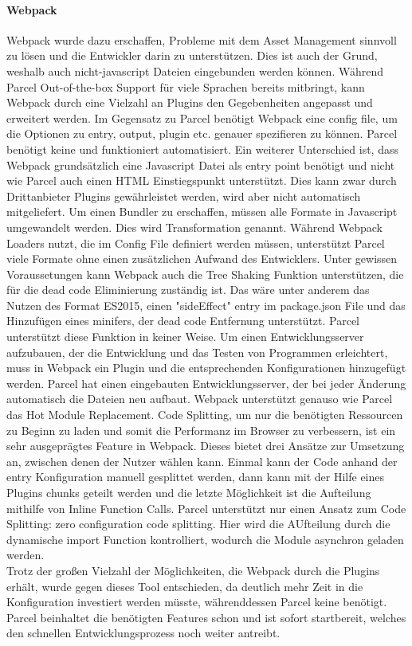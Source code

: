 \paragraph{Webpack} Webpack wurde dazu erschaffen, Probleme mit dem Asset Management sinnvoll zu lösen und die Entwickler darin zu unterstützen. Dies ist auch der Grund, weshalb auch nicht-javascript Dateien eingebunden werden können. Während Parcel Out-of-the-box Support für viele Sprachen bereits mitbringt, kann Webpack durch eine Vielzahl an Plugins den Gegebenheiten angepasst und erweitert werden. Im Gegensatz zu Parcel benötigt Webpack eine config file, um die Optionen zu entry, output, plugin etc. genauer spezifieren zu können. Parcel benötigt keine und funktioniert automatisiert. Ein weiterer Unterschied ist, dass Webpack grundsätzlich eine Javascript Datei als entry point benötigt und nicht wie Parcel auch einen HTML Einstiegspunkt unterstützt. Dies kann zwar durch Drittanbieter Plugins gewährleistet werden, wird aber nicht automatisch mitgeliefert. Um einen Bundler zu erschaffen, müssen alle Formate in Javascript umgewandelt werden. Dies wird Transformation genannt. Während Webpack Loaders nutzt, die im Config File definiert werden müssen, unterstützt Parcel viele Formate ohne einen zusätzlichen Aufwand des Entwicklers. Unter gewissen Voraussetungen kann Webpack auch die Tree Shaking Funktion unterstützen, die für die dead code Eliminierung zuständig ist. Das wäre unter anderem das Nutzen des Format  ES2015, einen "sideEffect" entry im package.json File und das Hinzufügen eines minifers, der dead code Entfernung unterstützt. Parcel unterstützt diese Funktion in keiner Weise. Um einen Entwicklungsserver aufzubauen, der die Entwicklung und das Testen von Programmen erleichtert, muss in Webpack ein Plugin und die entsprechenden Konfigurationen hinzugefügt werden. Parcel hat einen eingebauten Entwicklungsserver, der bei jeder Änderung automatisch die Dateien neu aufbaut. Webpack unterstützt genauso wie Parcel das Hot Module Replacement. Code Splitting, um nur die benötigten Ressourcen zu Beginn zu laden und somit die Performanz im Browser zu verbessern, ist ein sehr ausgeprägtes Feature in Webpack. Dieses bietet drei Ansätze zur Umsetzung an, zwischen denen der Nutzer wählen kann. Einmal kann der Code anhand der entry Konfiguration manuell gesplittet werden, dann kann mit der Hilfe eines Plugins chunks geteilt werden und die letzte Möglichkeit ist die Aufteilung mithilfe von Inline Function Calls. Parcel unterstützt nur einen Ansatz zum Code Splitting: zero configuration code splitting. Hier wird die AUfteilung durch die dynamische import Function kontrolliert, wodurch die Module asynchron geladen werden.
\\
Trotz der großen Vielzahl der Möglichkeiten, die Webpack durch die Plugins erhält, wurde gegen dieses Tool entschieden, da deutlich mehr Zeit in die Konfiguration investiert werden müsste, währenddessen Parcel keine benötigt. Parcel beinhaltet die benötigten Features schon und ist sofort startbereit, welches den schnellen Entwicklungsprozess noch weiter antreibt. 
